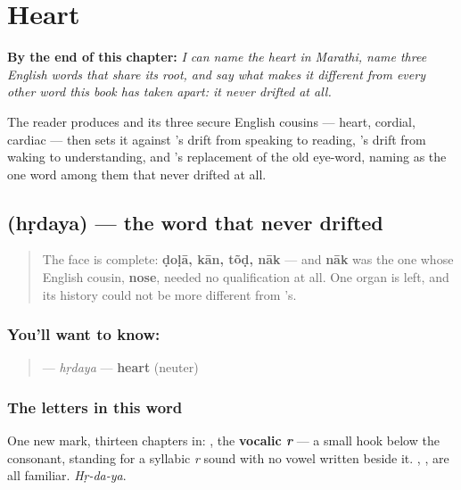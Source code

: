 
\chapter{Heart}
\label{ch:mr-heart}

\begin{chapteropening}
\textbf{By the end of this chapter:} \emph{I can name the heart in Marathi, name three English words that share its root, and say what makes it different from every other word this book has taken apart: it never drifted at all.}

The reader produces  and its three secure English cousins — heart, cordial, cardiac — then sets it against 's drift from speaking to reading, 's drift from waking to understanding, and 's replacement of the old eye-word, naming  as the one word among them that never drifted at all.
\end{chapteropening}

\section[hṛdaya]{ (hṛdaya) — the word that never drifted}

\label{lesson:MR-C13-hrudaya}



\begin{quote}
The face is complete: \textbf{ḍoḷā, kān, tõḍ, nāk} — and \textbf{nāk} was the one whose English cousin, \textbf{nose}, needed no qualification at all. One organ is left, and its history could not be more different from \textbf{}'s.
\end{quote}

\subsection*{You'll want to know: }
\begin{quote}
\textbf{} — \emph{hṛdaya} — \textbf{heart} (neuter)
\end{quote}

\subsection*{The letters in this word}
One new mark, thirteen chapters in: \textbf{}, the \textbf{vocalic \emph{r}} — a small hook below the consonant, standing for a syllabic \emph{r} sound with no vowel written beside it. \textbf{}, \textbf{}, \textbf{} are all familiar. \emph{Hṛ-da-ya}.

